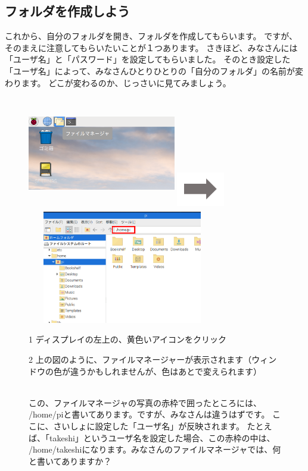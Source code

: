\documentclass[a4paper,12pt]{jarticle}
\begin{document}
\clearpage

\subsection{\theExercise フォルダを作成しよう}
これから、自分のフォルダを開き、フォルダを作成してもらいます。
ですが、そのまえに注意してもらいたいことが１つあります。
さきほど、みなさんには「ユーザ名」と「パスワード」を設定してもらいました。
そのとき設定した「ユーザ名」によって、みなさんひとりひとりの「自分のフォルダ」の名前が変わります。
どこが変わるのか、じっさいに見てみましょう。

\begin{figure}[ht]
\begin{minipage}{\textwidth}
  \includegraphics[width=6.472cm,height=4.976cm]{textbook-img032.png}
  \includegraphics[width=2.094cm,height=1.771cm]{textbook-img035.png}
  \includegraphics[width=8.301cm,height=4.948cm]{textbook-img1020.png}
\end{minipage}
\begin{minipage}{0.4\textwidth}
  1
  ディスプレイの左上の、黄色いアイコンをクリック
\end{minipage}
\vspace{20pt}
\hfill
\begin{minipage}{0.4\textwidth}
  2
  上の図のように、ファイルマネージャーが表示されます（ウィンドウの色が違うかもしれませんが、色はあとで変えられます）
\end{minipage}\\
この、ファイルマネージャの写真の赤枠で囲ったところには、
/home/piと書いてあります。ですが、みなさんは違うはずです。
ここに、さいしょに設定した「ユーザ名」が反映されます。
たとえば、「takeshi」というユーザ名を設定した場合、この赤枠の中は、
/home/takeshiになります。みなさんのファイルマネージャでは、何と書いてありますか？\\
\vspace{20pt}


\end{figure}
\end{document}
